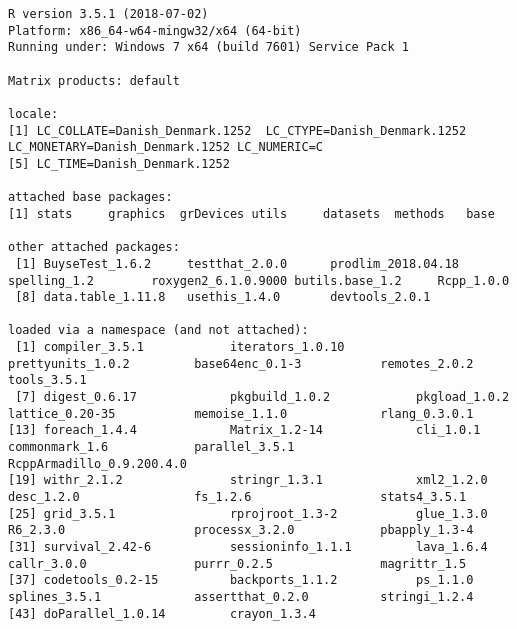 \documentclass[12pt]{article}
\begin{document}
\begin{verbatim}
R version 3.5.1 (2018-07-02)
Platform: x86_64-w64-mingw32/x64 (64-bit)
Running under: Windows 7 x64 (build 7601) Service Pack 1

Matrix products: default

locale:
[1] LC_COLLATE=Danish_Denmark.1252  LC_CTYPE=Danish_Denmark.1252    LC_MONETARY=Danish_Denmark.1252 LC_NUMERIC=C                   
[5] LC_TIME=Danish_Denmark.1252    

attached base packages:
[1] stats     graphics  grDevices utils     datasets  methods   base     

other attached packages:
 [1] BuyseTest_1.6.2     testthat_2.0.0      prodlim_2018.04.18  spelling_1.2        roxygen2_6.1.0.9000 butils.base_1.2     Rcpp_1.0.0         
 [8] data.table_1.11.8   usethis_1.4.0       devtools_2.0.1     

loaded via a namespace (and not attached):
 [1] compiler_3.5.1            iterators_1.0.10          prettyunits_1.0.2         base64enc_0.1-3           remotes_2.0.2             tools_3.5.1              
 [7] digest_0.6.17             pkgbuild_1.0.2            pkgload_1.0.2             lattice_0.20-35           memoise_1.1.0             rlang_0.3.0.1            
[13] foreach_1.4.4             Matrix_1.2-14             cli_1.0.1                 commonmark_1.6            parallel_3.5.1            RcppArmadillo_0.9.200.4.0
[19] withr_2.1.2               stringr_1.3.1             xml2_1.2.0                desc_1.2.0                fs_1.2.6                  stats4_3.5.1             
[25] grid_3.5.1                rprojroot_1.3-2           glue_1.3.0                R6_2.3.0                  processx_3.2.0            pbapply_1.3-4            
[31] survival_2.42-6           sessioninfo_1.1.1         lava_1.6.4                callr_3.0.0               purrr_0.2.5               magrittr_1.5             
[37] codetools_0.2-15          backports_1.1.2           ps_1.1.0                  splines_3.5.1             assertthat_0.2.0          stringi_1.2.4            
[43] doParallel_1.0.14         crayon_1.3.4
\end{verbatim}
\end{document}
